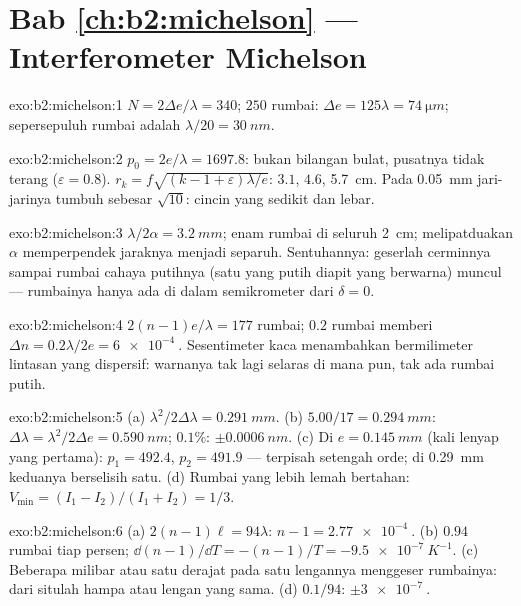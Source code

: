 \section*{Bab \ref{ch:b2:michelson} --- Interferometer Michelson}

\begin{solution}{exo:b2:michelson:1}
$N = 2\Delta e/\lambda = 340$; $250$ rumbai: $\Delta e = 125\lambda = \qty{74}{\micro m}$; sepersepuluh
rumbai adalah $\lambda/20 = \qty{30}{nm}$.
\end{solution}

\begin{solution}{exo:b2:michelson:2}
$p_0 = 2e/\lambda = 1697.8$: bukan bilangan bulat, pusatnya tidak terang ($\varepsilon =
0.8$). $r_k = f\sqrt{(k - 1 + \varepsilon)\lambda/e}$: $3.1$, $4.6$, \qty{5.7}{cm}. Pada \qty{0.05}{mm}
jari-jarinya tumbuh sebesar $\sqrt{10}$: cincin yang sedikit dan lebar.
\end{solution}

\begin{solution}{exo:b2:michelson:3}
$\lambda/2\alpha = \qty{3.2}{mm}$; enam rumbai di seluruh \qty{2}{cm}; melipatduakan $\alpha$ memperpendek
jaraknya menjadi separuh. Sentuhannya: geserlah cerminnya sampai rumbai cahaya putihnya
(satu yang putih diapit yang berwarna) muncul --- rumbainya hanya ada di dalam
semikrometer dari $\delta = 0$.
\end{solution}

\begin{solution}{exo:b2:michelson:4}
$2(n - 1)e/\lambda = 177$ rumbai; $0.2$ rumbai memberi $\Delta n = 0.2\lambda/2e = \qty{6e-4}{}$.
Sesentimeter kaca menambahkan bermilimeter lintasan yang dispersif: warnanya
tak lagi selaras di mana pun, tak ada rumbai putih.
\end{solution}

\begin{solution}{exo:b2:michelson:5}
(a) $\lambda^2/2\Delta\lambda = \qty{0.291}{mm}$. (b) $5.00/17 = \qty{0.294}{mm}$: $\Delta\lambda = \lambda^2/2\Delta e =
\qty{0.590}{nm}$; $0.1\%$: $\pm\qty{0.0006}{nm}$. (c) Di $e = \qty{0.145}{mm}$ (kali lenyap
yang pertama): $p_1 = 492.4$, $p_2 = 491.9$ --- terpisah setengah orde; di
\qty{0.29}{mm} keduanya berselisih satu. (d) Rumbai yang lebih lemah bertahan: $V_{\min} =
(I_1 - I_2)/(I_1 + I_2) = 1/3$.
\end{solution}

\begin{solution}{exo:b2:michelson:6}
(a) $2(n - 1)\ell = 94\lambda$: $n - 1 = \qty{2.77e-4}{}$. (b) $0.94$ rumbai tiap persen;
$\dd(n - 1)/\dd T = -(n - 1)/T = \qty{-9.5e-7}{K^{-1}}$. (c) Beberapa milibar atau satu
derajat pada satu lengannya menggeser rumbainya: dari situlah hampa atau lengan yang sama. (d)
$0.1/94$: $\pm\qty{3e-7}{}$.
\end{solution}

